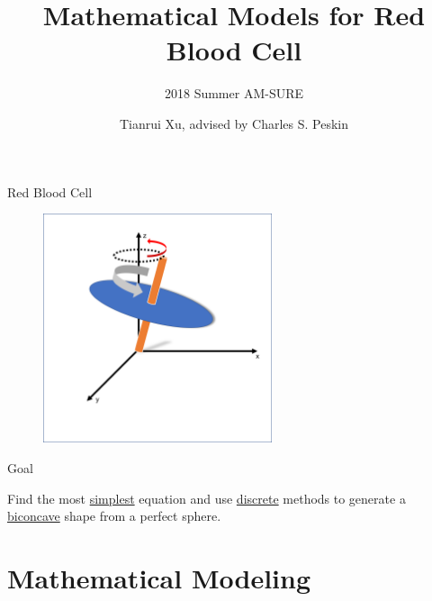 \documentclass[10pt]{beamer}
\title{Mathematical Models for Red Blood Cell}
\subtitle{2018 Summer AM-SURE}
\date{}
\author{Tianrui Xu, advised by Charles S. Peskin}
\institute{Courant Institute of Mathematical Sciences, New York University}
\begin{document}
\maketitle

\begin{frame}[fragile]{Red Blood Cell}
\begin{figure}[h]
	\centering
	\includegraphics[width=0.6\textwidth]{sphere1.png}
\end{figure}

\end{frame}

\begin{frame}{Goal}

Find the most \underline{simplest} equation and use \underline{discrete} methods to generate a \underline{biconcave} shape from a perfect sphere.

\end{frame}

\section{Mathematical Modeling}
\end{document}
